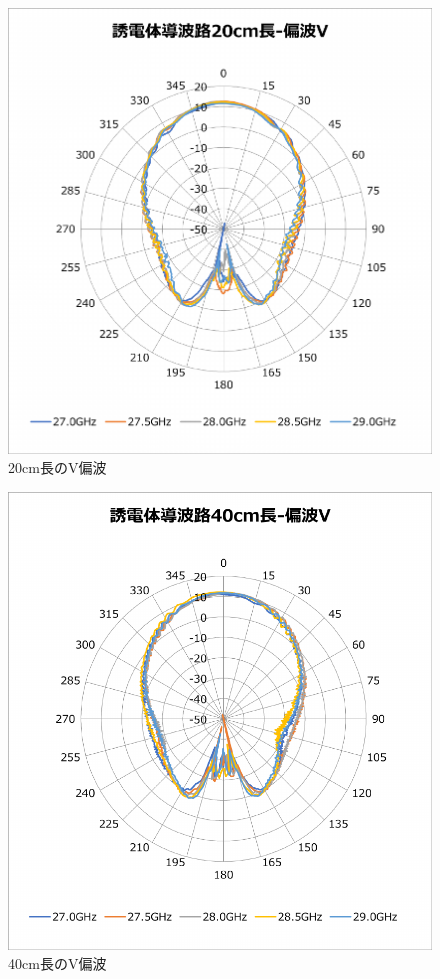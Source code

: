 \documentclass[technicalreport]{ieicej}
\begin{document}
\begin{figure}[tb]
  \begin{center}
    \includegraphics[bb=0 0 408 430, width=0.9\linewidth]{img/waveguide-20cm-v.pdf}
    \caption{20cm長のV偏波}
    \label{fig:20cm-v}
  \end{center}
\end{figure}

\begin{figure}[tb]
  \begin{center}
    \includegraphics[bb=0 0 408 430, width=0.9\linewidth]{img/waveguide-40cm-v.pdf}
    \caption{40cm長のV偏波}
    \label{fig:40cm-v}
  \end{center}
\end{figure}
\end{document}
